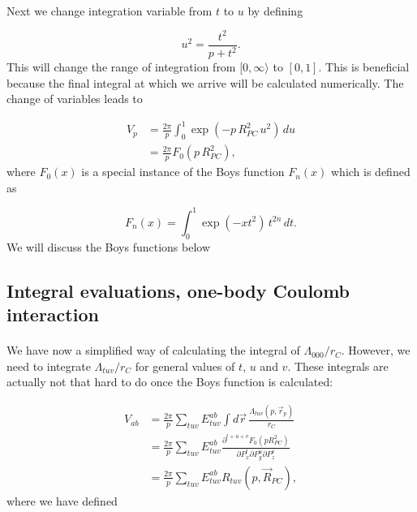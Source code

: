 \documentclass[%
twoside,                 %
final,                   %
10pt]{article}
\begin{document}
\paragraph{}

Next we change integration variable from $t$ to $u$ by defining

\begin{equation}
 u^2 = \frac{t^2}{p + t^2}.
\end{equation}
This will change the range of integration from $[0,\infty\rangle$ to $[0,1]$. This is beneficial because the final integral at which we arrive will be calculated numerically.
The change of variables leads to

\begin{align}
\label{eq:V_p}
 V_p & = \frac{2\pi}{p}\int_0^1\exp(-p\,R^2_{PC}\,u^2)\,du \\
     & = \frac{2\pi}{p}F_0(p\,R^2_{PC}),
\end{align}
where $F_0(x)$ is a special instance of the Boys function $F_n(x)$ which is defined as

\begin{equation}
 F_n(x) = \int_0^1\exp(-xt^2)\,t^{2n}\,dt.
\end{equation}
We will discuss the Boys functions below



\subsection*{Integral evaluations, one-body Coulomb interaction}

\paragraph{}

We have now a  simplified way of calculating the integral of $\Lambda_{000}/r_C$. However, we need to integrate $\Lambda_{tuv}/r_C$ for general values of $t$, $u$ and $v$.
These integrals are actually not that hard to do once the Boys function is calculated:

\begin{align}
 V_{ab} & = \frac{2\pi}{p}\sum_{tuv}E^{ab}_{tuv}\int d\vec r \, \frac{\Lambda_{tuv}(p,\vec r_p)}{r_C} \\
        & = \frac{2\pi}{p}\sum_{tuv}E^{ab}_{tuv} \frac{\partial^{t+u+v} F_0(p R^2_{PC})}{\partial P_x^t \partial P_y^u \partial P_z^v} \\
        & = \frac{2\pi}{p}\sum_{tuv}E^{ab}_{tuv} R_{tuv}(p,\vec R_{PC}), \label{eq:V_ab}
\end{align}
where we have defined
\end{document}
